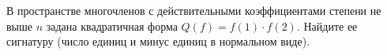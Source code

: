 \documentclass{article}
\begin{document}
В пространстве многочленов с действительными коэффициентами степени не выше $n$ задана
квадратичная форма $Q(f) = f(1) \cdot f(2)$. Найдите ее сигнатуру (число единиц и минус единиц в нормальном виде).
\end{document}
